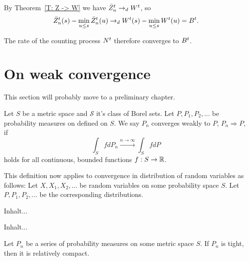 By Theorem~\ref{T: Z -> W} we have $\bar{Z}^t_n \rightarrow_d W^t$,
so
\begin{equation}
\bar{Z}^t_n(s) - \min_{u \leq s}\bar{Z}^t_n(u) \rightarrow_d W^t(s) - \min_{u \leq s}W^t(u) = B^t.
\end{equation}


The rate of the counting process $N^t$ therefore converges to $B^t$.


\section{On weak convergence}

This section will probably move to a preliminary chapter.
\begin{definition}
	Let $S$ be a metric space and $\mathcal{S}$ it's class of Borel sets.
	Let $P, P_1, P_2, \dots$ be probability measures on defined on $S$.
	We say $P_n$ converges weakly to $P$, $P_n \Rightarrow P$, if
	\begin{equation} 
	\int_S fdP_n \xrightarrow{n \rightarrow \infty} \int_S fdP
	\end{equation}
	holds for all continuous, bounded functions $f: S \rightarrow \mathbb{R}$.
\end{definition}

This definition now applies to convergence in distribution of random variables as follows:
Let $X, X_1, X_2, \dots$ be random variables on some probability space $S$.
Let $P, P_1, P_2, \dots$ be the corresponding distributions. 

\begin{definition}[Tightness] \label{D: Tightness}
	Inhalt...
\end{definition}

\begin{definition} \label{D: Rel Compactness}
	Inhalt...
\end{definition}

\begin{theorem} \label{T: Prohorov}
	Let $P_n$ be a series of probability measures on some metric space $S$. If $P_n$ is tight, then it is relatively compact.
\end{theorem}



